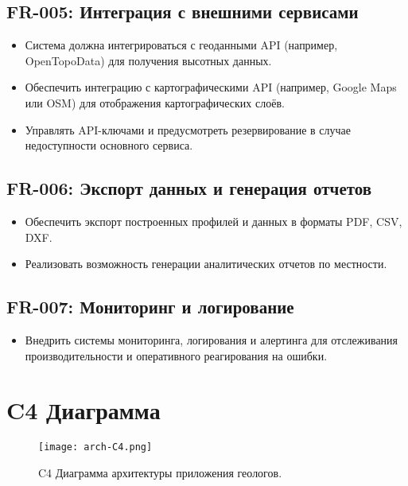 \documentclass[a4paper,12pt]{article}
\begin{document}
\subsection*{FR-005: Интеграция с внешними сервисами}
\begin{itemize}[leftmargin=1cm]
    \item Система должна интегрироваться с геоданными API (например, OpenTopoData) для получения высотных данных.
    \item Обеспечить интеграцию с картографическими API (например, Google Maps или OSM) для отображения картографических слоёв.
    \item Управлять API-ключами и предусмотреть резервирование в случае недоступности основного сервиса.
\end{itemize}

\subsection*{FR-006: Экспорт данных и генерация отчетов}
\begin{itemize}[leftmargin=1cm]
    \item Обеспечить экспорт построенных профилей и данных в форматы PDF, CSV, DXF.
    \item Реализовать возможность генерации аналитических отчетов по местности.
\end{itemize}

\subsection*{FR-007: Мониторинг и логирование}
\begin{itemize}[leftmargin=1cm]
    \item Внедрить системы мониторинга, логирования и алертинга для отслеживания производительности и оперативного реагирования на ошибки.
\end{itemize}

\newpage 

\section{C4 Диаграмма}
\begin{figure}[!ht]
    \centering
    \texttt{[image: arch-C4.png]}
    \caption{C4 Диаграмма архитектуры приложения геологов.}
    \label{fig:c4diagram}
\end{figure}
\end{document}
